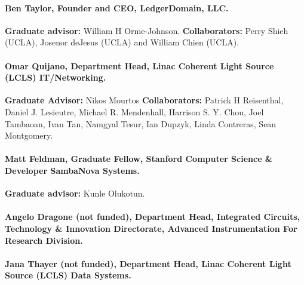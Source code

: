 \documentclass{article}
\begin{document}
\paragraph{Ben Taylor, Founder and CEO, LedgerDomain, LLC.  }
\textbf{Graduate advisor: } William H Orme-Johnson.
\textbf{Collaborators: }
Perry Shieh (UCLA), Josenor deJesus (UCLA) and William Chien (UCLA).

\paragraph{Omar Quijano, Department Head, Linac Coherent Light Source (LCLS) IT/Networking. }
\textbf{Graduate Advisor: } Nikos Mourtos
\textbf{Collaborators: }
Patrick H Reisenthal, Daniel J. Lesieutre, Michael R. Mendenhall, Harrison S. Y. Chou, Joel Tambaoan, Ivan Tan, Namgyal Tesur, Ian Dupzyk, Linda Contreras, Sean Montgomery.

\paragraph{Matt Feldman, Graduate Fellow, Stanford Computer Science \& Developer SambaNova Systems. }
\textbf{Graduate advisor: } Kunle Olukotun.

\paragraph{Angelo Dragone (not funded), Department Head, Integrated Circuits, Technology \& Innovation Directorate, Advanced Instrumentation For Research Division. }

\paragraph{Jana Thayer (not funded), Department Head, Linac Coherent Light Source (LCLS) Data Systems. }


\end{document}
